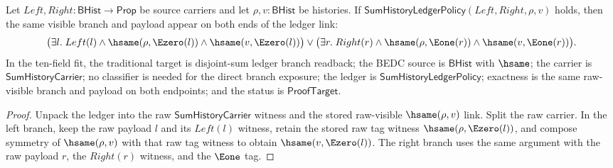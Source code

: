\begin{theorem}
\label{thm:sum-ledger-raw-visible-branch-partition}
Let $Left,Right:\mathsf{BHist}\to\mathsf{Prop}$ be source carriers and let
$\rho,v:\mathsf{BHist}$ be histories. If
$\mathsf{SumHistoryLedgerPolicy}(Left,Right,\rho,v)$ holds, then the same
visible branch and payload appear on both ends of the ledger link:
$$
\bigl(\exists l.\; Left(l)\land\hsame(\rho,\Ezero(l))\land\hsame(v,\Ezero(l))\bigr)
\lor
\bigl(\exists r.\; Right(r)\land\hsame(\rho,\Eone(r))\land\hsame(v,\Eone(r))\bigr).
$$
In the ten-field fit, the traditional target is disjoint-sum ledger branch
readback; the BEDC source is $\mathsf{BHist}$ with $\hsame$; the carrier is
$\mathsf{SumHistoryCarrier}$; no classifier is needed for the direct branch
exposure; the ledger is $\mathsf{SumHistoryLedgerPolicy}$; exactness is the
same raw-visible branch and payload on both endpoints; and the status is
$\mathsf{ProofTarget}$.
\end{theorem}
\begin{proof}
Unpack the ledger into the raw $\mathsf{SumHistoryCarrier}$ witness and the
stored raw-visible $\hsame(\rho,v)$ link. Split the raw carrier. In the left
branch, keep the raw payload $l$ and its $Left(l)$ witness, retain the stored
raw tag witness $\hsame(\rho,\Ezero(l))$, and compose symmetry of
$\hsame(\rho,v)$ with that raw tag witness to obtain
$\hsame(v,\Ezero(l))$. The right branch uses the same argument with the raw
payload $r$, the $Right(r)$ witness, and the $\Eone$ tag.
\end{proof}
